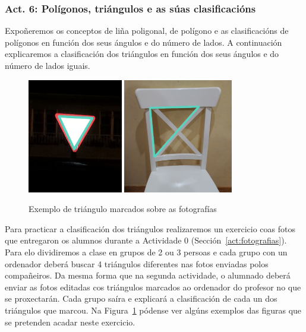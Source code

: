 \subsubsection{Act. 6: Polígonos, triángulos e as súas clasificacións}\label{act:clastriangulos}
Expoñeremos os conceptos de liña poligonal, de polígono e as clasificacións de polígonos en función dos seus ángulos e do número de lados. A continuación explicaremos a clasificación dos triángulos en función dos seus ángulos e do número de lados iguais.

\begin{figure}[h!]
  \centering
  \includegraphics[height=5cm]{img/trian1.jpg}
  \includegraphics[height=5cm]{img/trian2.jpg}
  \caption{Exemplo de triángulo marcados sobre as fotografías}\label{fig:act7}
\end{figure}

Para practicar a clasificación dos triángulos realizaremos un exercicio coas fotos que entregaron os alumnos durante a Actividade 0 (Sección~\ref{act:fotografias}). Para elo dividiremos a clase en grupos de 2 ou 3 persoas e cada grupo con un ordenador deberá buscar 4 triángulos diferentes nas fotos enviadas polos compañeiros. Da mesma forma que na segunda actividade, o alumnado deberá enviar as fotos editadas cos triángulos marcados ao ordenador do profesor no que se proxectarán. Cada grupo saíra e explicará a clasificación de cada un dos triángulos que marcou. Na Figura~\ref{fig:act7} pódense ver algúns exemplos das figuras que se pretenden acadar neste exercicio.

